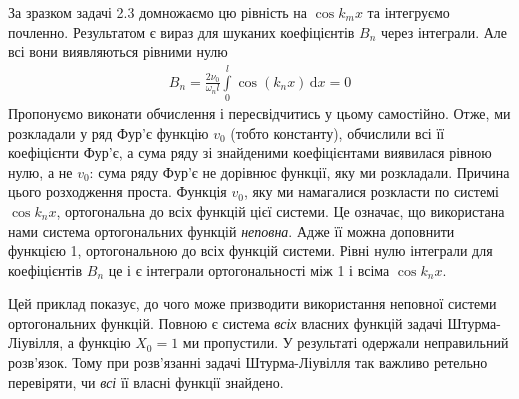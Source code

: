 За зразком задачі 2.3 домножаємо цю рівність на $\cos k_mx$ та інтегруємо почленно. Результатом є вираз для шуканих коефіцієнтів $B_n$ через інтеграли. Але всі вони виявляються рівними нулю
\begin{equation*}
    \begin{aligned}
        B_n =\frac{2\nu_0}{\omega_n l} \int\limits_0^l \cos(k_n x)\,\mathrm{d}x = 0 
    \end{aligned}
\end{equation*} 
Пропонуємо виконати обчислення і пересвідчитись у цьому самостійно. Отже, ми розкладали  у ряд Фур'є функцію $v_0$ (тобто константу), обчислили всі її коефіцієнти Фур'є, а сума ряду зі знайденими коефіцієнтами виявилася рівною нулю, а не $v_0$: сума ряду Фур'є не дорівнює функції, яку ми  розкладали. 
Причина цього розходження проста. Функція $v_0$, яку ми намагалися розкласти по системі $\cos k_nx$, ортогональна до всіх функцій цієї системи. Це означає, що використана нами система ортогональних функцій \textit{неповна}. Адже її можна доповнити функцією 1, ортогональною до всіх функцій системи. Рівні нулю інтеграли для коефіцієнтів $B_n$ це і є інтеграли ортогональності між 1 і всіма $\cos k_nx$. 

Цей приклад показує, до чого може призводити використання неповної системи ортогональних функцій. Повною є система \textit{всіх} власних функцій задачі Штурма-Ліувілля, а функцію $X_0=1$ ми пропустили. У результаті одержали неправильний розв'язок. Тому при розв'язанні задачі Штурма-Ліувілля так важливо ретельно перевіряти, чи \textit{всі} її власні функції знайдено.
 








%
